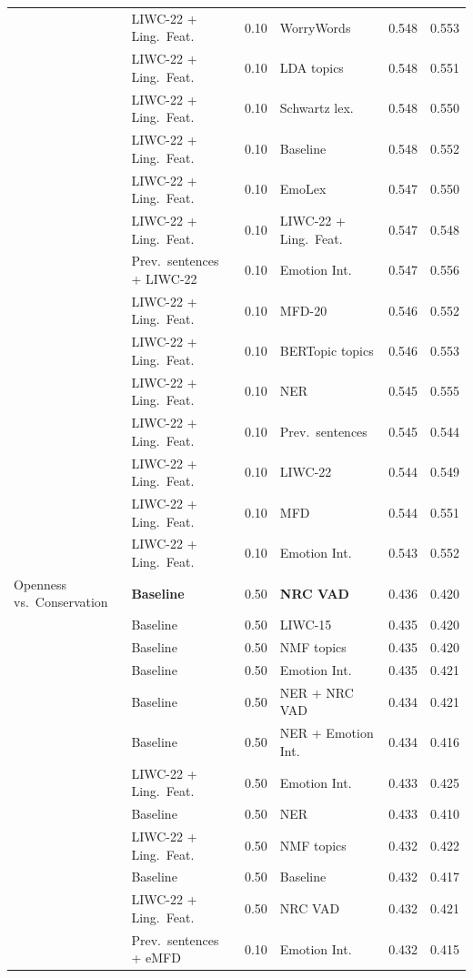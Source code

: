 {\begin{longtable}{llclcc}
 & LIWC-22 + Ling.\ Feat. & 0.10 & WorryWords & 0.548 & 0.553 \\
 & LIWC-22 + Ling.\ Feat. & 0.10 & LDA topics & 0.548 & 0.551 \\
 & LIWC-22 + Ling.\ Feat. & 0.10 & Schwartz lex. & 0.548 & 0.550 \\
 & LIWC-22 + Ling.\ Feat. & 0.10 & Baseline & 0.548 & 0.552 \\
 & LIWC-22 + Ling.\ Feat. & 0.10 & EmoLex & 0.547 & 0.550 \\
 & LIWC-22 + Ling.\ Feat. & 0.10 & LIWC-22 + Ling.\ Feat. & 0.547 & 0.548 \\
 & Prev.\ sentences + LIWC-22 & 0.10 & Emotion Int. & 0.547 & 0.556 \\
 & LIWC-22 + Ling.\ Feat. & 0.10 & MFD-20 & 0.546 & 0.552 \\
 & LIWC-22 + Ling.\ Feat. & 0.10 & BERTopic topics & 0.546 & 0.553 \\
 & LIWC-22 + Ling.\ Feat. & 0.10 & NER & 0.545 & 0.555 \\
 & LIWC-22 + Ling.\ Feat. & 0.10 & Prev.\ sentences & 0.545 & 0.544 \\
 & LIWC-22 + Ling.\ Feat. & 0.10 & LIWC-22 & 0.544 & 0.549 \\
 & LIWC-22 + Ling.\ Feat. & 0.10 & MFD & 0.544 & 0.551 \\
 & LIWC-22 + Ling.\ Feat. & 0.10 & Emotion Int. & 0.543 & 0.552 \\
Openness vs.\ Conservation & \textbf{Baseline} & 0.50 & \textbf{NRC VAD} & 0.436 & 0.420 \\
 & Baseline & 0.50 & LIWC-15 & 0.435 & 0.420 \\
 & Baseline & 0.50 & NMF topics & 0.435 & 0.420 \\
 & Baseline & 0.50 & Emotion Int. & 0.435 & 0.421 \\
 & Baseline & 0.50 & NER + NRC VAD & 0.434 & 0.421 \\
 & Baseline & 0.50 & NER + Emotion Int. & 0.434 & 0.416 \\
 & LIWC-22 + Ling.\ Feat. & 0.50 & Emotion Int. & 0.433 & 0.425 \\
 & Baseline & 0.50 & NER & 0.433 & 0.410 \\
 & LIWC-22 + Ling.\ Feat. & 0.50 & NMF topics & 0.432 & 0.422 \\
 & Baseline & 0.50 & Baseline & 0.432 & 0.417 \\
 & LIWC-22 + Ling.\ Feat. & 0.50 & NRC VAD & 0.432 & 0.421 \\
 & Prev.\ sentences + eMFD & 0.10 & Emotion Int. & 0.432 & 0.415 \\

\end{longtable}}
